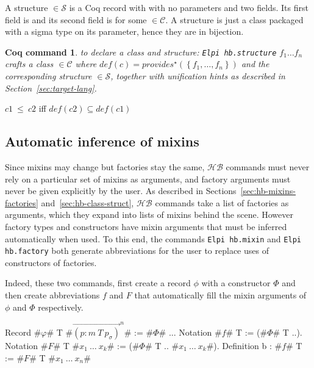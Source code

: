 \documentclass[a4paper,UKenglish,cleveref, autoref]{lipics-v2019}
\newcommand{\HB}{\ensuremath{\mathcal{HB}}}
\newcommand{\mixin}{mixin}
\newcommand{\mixins}{mixins}
\newcommand{\factory}{factory}
\newcommand{\factories}{factories}
\newcommand{\phantterms}{abbreviations}
\newcommand{\C}{\ensuremath{\mathcal{C}}}
\newcommand{\cdef}{\ensuremath{\mathit{def}}}
\newcommand{\Str}{\ensuremath{\mathcal{S}}}
\newcommand{\structure}{structure}
\newcommand{\issubclass}{\ensuremath{\leq}}
\newcommand{\subclass}{subclass}
\newcommand{\provides}{\ensuremath{\mathit{provides}}}
\newcommand{\set}[1]{\left\{#1\right\}}
\newcommand{\enum}[2]{\ensuremath{\set{#1,\ldots,#2}}}
\newcommand{\vect}[1]{\overrightarrow{#1}}
\newcommand{\pmp}[1]{\ensuremath{\vect{\left(p : m\ T\ p_\sigma\right)}^{#1}}}
\newcommand{\hbmixin}{{\tt\color{dkgreen}Elpi hb.mixin}}
\newcommand{\hbfactory}{{\tt\color{dkgreen}Elpi hb.factory}}
\newcommand{\hbstructure}{{\tt\color{dkgreen}Elpi hb.structure}}
\theoremstyle{implem}
\theoremstyle{implem}
\theoremstyle{command}
\newtheorem*{command}{Coq command}
\begin{document}
\begin{definition}[\Str{} Structure]
A \structure{}  \(\in \Str{}\) is a Coq record with with no parameters
and two fields. Its first field is  and its second field is
 for some  \(\in \C{}\).
A structure is just a class packaged with a sigma type on its parameter, hence
they are in bijection.
\end{definition}


\begin{command} to declare a class and structure: \hbstructure{}  \(f_1 \ldots f_n\)
  crafts a class  $\in \C{}$ where
  $\cdef{}(c) = \provides{}^\star\left(\enum{f_1}{f_n}\right) $ and the
  corresponding structure  $\in \Str{}$, together with
  unification hints as described in Section~\ref{sec:target-lang}.
\end{command}


\begin{definition}[\issubclass{} \(\in \C{}\times\C{}\), \subclass{}]\label{def:subclass}
  \(c1~\issubclass{}~c2\) iff \(\cdef{}(c2) \subseteq \cdef{}(c1)\)
  \end{definition}

\subsection{Automatic inference of \mixins{}}
\label{sec:autom-infer-mixins}

Since \mixins{} may change but \factories{} stay the same, \HB{}
commands must never rely on a particular set of \mixins{} as
arguments, and \factory{} arguments must never be given explicitly by
the user. As described in Sections~\ref{sec:hb-mixins-factories}
and~\ref{sec:hb-class-struct}, \HB{} commands take a list of
\factories{} as arguments, which they expand into lists of \mixins{}
behind the scene. However \factory{} types and constructors have
\mixin{} arguments that must be inferred automatically when used. To
this end, the commands \hbmixin{} and \hbfactory{} both generate
\phantterms{} for the user to replace uses of constructors of \factories{}.

Indeed, these two commands, first create a record \(\phi\) with a
constructor \(\Phi\) and then create abbreviations \(f\) and \(F\)
that automatically fill the mixin arguments of \(\phi\) and \(\Phi\)
respectively.

\begin{coqcode}
Record #\(\varphi\)# T #\(\pmp{n}\)# := #\(\Phi\)# {..}.
Notation #$f$# T := (#\(\Phi\)# T ..).
Notation #$F$# T  #\(x_1\ \ldots\ x_k\)# := (#\(\Phi\)# T .. #\(x_1\ \ldots\ x_k\)#).
Definition b : #$f$# T := #$F$# T #\(x_1\ \ldots\ x_n\)#
\end{coqcode}
\end{document}
